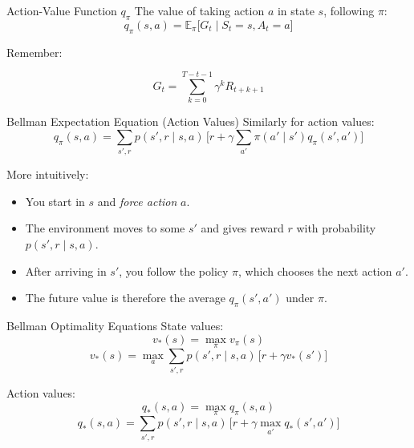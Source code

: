 \documentclass[11pt]{beamer}
\begin{document}
\begin{frame}{Action-Value Function $q_\pi$}
The value of taking action $a$ in state $s$, following $\pi$:
\[
 q_\pi(s,a) = \mathbb{E}_\pi\big[ G_t \mid S_t=s, A_t=a \big]
\]

Remember: 

\[
G_t = \sum_{k=0}^{T-t-1} \gamma^k R_{t+k+1}
\]

\end{frame}




\begin{frame}{Bellman Expectation Equation (Action Values)}
Similarly for action values:
\[
 q_\pi(s,a) = \sum_{s',r} p(s',r\mid s,a)\,\Big[r + \gamma \sum_{a'} \pi(a'\mid s') q_\pi(s',a')\Big]
\]

More intuitively:

\begin{itemize}
	\item You start in $s$ and \emph{force action} $a$.
	\item The environment moves to some $s'$ and gives reward $r$ with probability $p(s', r \mid s, a)$.
	\item After arriving in $s'$, you follow the policy $\pi$, which chooses the next action $a'$.
	\item The future value is therefore the average $q_\pi(s', a')$ under $\pi$.
\end{itemize}

\end{frame}

%

\begin{frame}{Bellman Optimality Equations}
State values:
\[
v_*(s) = \max_\pi v_\pi(s)
\]
\[
v_*(s) = \max_a \sum_{s',r} p(s',r\mid s,a)\,\big[r + \gamma v_*(s')\big]
\]

Action values:
\[
q_*(s,a) = \max_\pi q_\pi(s,a)
\]
\[
 q_*(s,a) = \sum_{s',r} p(s',r\mid s,a)\,\Big[r + \gamma \max_{a'} q_*(s',a')\Big]
\]

\end{frame}
\end{document}
